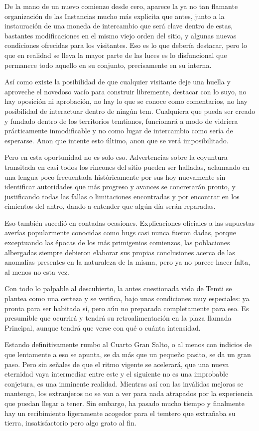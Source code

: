 \documentclass[
]{book}
\begin{document}
De la mano de un nuevo comienzo desde cero, aparece la ya no tan flamante organización de las Instancias mucho más explicita que antes, junto a la instauración de una moneda de intercambio que será clave dentro de estas, bastantes modificaciones en el mismo viejo orden del sitio, y algunas nuevas condiciones ofrecidas para los visitantes. Eso es lo que debería destacar, pero lo que en realidad se lleva la mayor parte de las luces es lo disfuncional que permanece todo aquello en su conjunto, precisamente en su interna.

Así como existe la posibilidad de que cualquier visitante deje una huella y aproveche el novedoso vacío para construir libremente, destacar con lo suyo, no hay oposición ni aprobación, no hay lo que se conoce como comentarios, no hay posibilidad de interactuar dentro de ningún tem. Cualquiera que pueda ser creado y fundado dentro de los territorios temtianos, funcionará a modo de vidriera prácticamente inmodificable y no como lugar de intercambio como sería de esperarse. Anon que intente esto último, anon que se verá imposibilitado.

Pero en esta oportunidad no es solo eso. Advertencias sobre la coyuntura transitada en casi todos los rincones del sitio pueden ser halladas, aclamando en una lengua poco frecuentada históricamente por sus hoy nuevamente sin identificar autoridades que más progreso y avances se concretarán pronto, y justificando todas las fallas o limitaciones encontradas y por encontrar en los cimientos del antro, dando a entender que algún día serán reparadas.

Eso también sucedió en contadas ocasiones. Explicaciones oficiales a las supuestas averías popularmente conocidas como bugs casi nunca fueron dadas, porque exceptuando las épocas de los más primigenios comienzos, las poblaciones albergadas siempre debieron elaborar sus propias conclusiones acerca de las anomalías presentes en la naturaleza de la misma, pero ya no parece hacer falta, al menos no esta vez.

Con todo lo palpable al descubierto, la antes cuestionada vida de Temti se plantea como una certeza y se verifica, bajo unas condiciones muy especiales: ya pronta para ser habitada sí, pero aún no preparada completamente para eso. Es presumible que ocurrirá y tendrá su retroalimentación en la plaza llamada Principal, aunque tendrá que verse con qué o cuánta intensidad.

Estando definitivamente rumbo al Cuarto Gran Salto, o al menos con indicios de que lentamente a eso se apunta, se da más que un pequeño pasito, se da un gran paso. Pero sin señales de que el ritmo vigente se acelerará, que una nueva eternidad vaya intermediar entre este y el siguiente no es una improbable conjetura, es una inminente realidad. Mientras así con las inválidas mejoras se mantenga, los extranjeros no se van a ver para nada atrapados por la experiencia que puedan llegar a tener. Sin embargo, ha pasado mucho tiempo y finalmente hay un recibimiento ligeramente acogedor para el temtero que extrañaba su tierra, insatisfactorio pero algo grato al fin.
\end{document}
